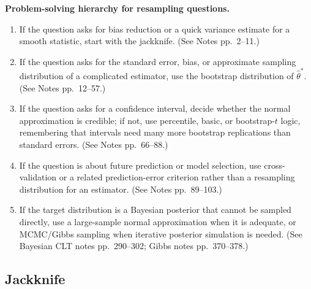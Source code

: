 \begin{mybox}
\textbf{Problem-solving hierarchy for resampling questions.}
\begin{enumerate}
    \item If the question asks for bias reduction or a quick variance estimate for a smooth statistic, start with the jackknife. (See Notes pp.~2--11.)
    \item If the question asks for the standard error, bias, or approximate sampling distribution of a complicated estimator, use the bootstrap distribution of $\hat\theta^*$. (See Notes pp.~12--57.)
    \item If the question asks for a confidence interval, decide whether the normal approximation is credible; if not, use percentile, basic, or bootstrap-$t$ logic, remembering that intervals need many more bootstrap replications than standard errors. (See Notes pp.~66--88.)
    \item If the question is about future prediction or model selection, use cross-validation or a related prediction-error criterion rather than a resampling distribution for an estimator. (See Notes pp.~89--103.)
    \item If the target distribution is a Bayesian posterior that cannot be sampled directly, use a large-sample normal approximation when it is adequate, or MCMC/Gibbs sampling when iterative posterior simulation is needed. (See Bayesian CLT notes pp.~290--302; Gibbs notes pp.~370--378.)
\end{enumerate}
\end{mybox}

\subsection{Jackknife}
